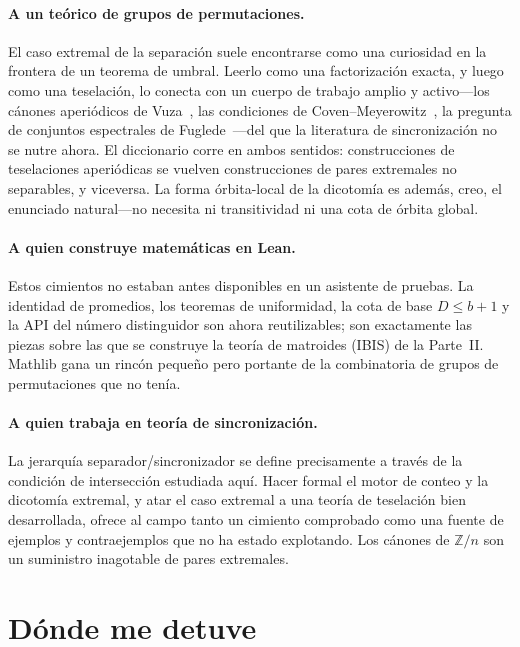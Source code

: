 \documentclass[11pt]{article}
\newcommand{\Z}{\mathbb{Z}}
\begin{document}
\paragraph{A un teórico de grupos de permutaciones.} El caso extremal de la separación
suele encontrarse como una curiosidad en la frontera de un teorema de umbral. Leerlo
como una factorización exacta, y luego como una teselación, lo conecta con un cuerpo de
trabajo amplio y activo---los cánones aperiódicos de Vuza~\cite{Vuza1991}, las
condiciones de Coven--Meyerowitz~\cite{CovenMeyerowitz1999}, la pregunta de conjuntos
espectrales de Fuglede~\cite{Fuglede1974}---del que la literatura de sincronización no
se nutre ahora. El diccionario corre en ambos sentidos: construcciones de teselaciones
aperiódicas se vuelven construcciones de pares extremales no separables, y viceversa.
La forma órbita-local de la dicotomía es además, creo, el enunciado natural---no
necesita ni transitividad ni una cota de órbita global.

\paragraph{A quien construye matemáticas en Lean.} Estos cimientos no estaban antes
disponibles en un asistente de pruebas. La identidad de promedios, los teoremas de
uniformidad, la cota de base $D\le b+1$ y la API del número distinguidor son ahora
reutilizables; son exactamente las piezas sobre las que se construye la teoría de
matroides (IBIS) de la Parte~II. Mathlib gana un rincón pequeño pero portante de la
combinatoria de grupos de permutaciones que no tenía.

\paragraph{A quien trabaja en teoría de sincronización.} La jerarquía
separador/sincronizador se define precisamente a través de la condición de intersección
estudiada aquí. Hacer formal el motor de conteo y la dicotomía extremal, y atar el caso
extremal a una teoría de teselación bien desarrollada, ofrece al campo tanto un cimiento
comprobado como una fuente de ejemplos y contraejemplos que no ha estado explotando.
Los cánones de $\Z/n$ son un suministro inagotable de pares extremales.

\section{Dónde me detuve}
\label{sec:future}
\end{document}
